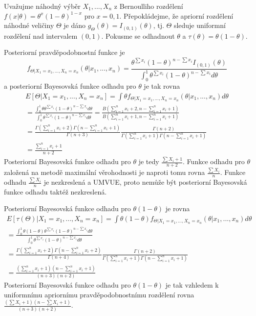\begin{example}
Uvažujme náhodný výběr $X_1, ..., X_n$ z Bernoulliho rozdělení $f(x|\theta) = \theta^x(1 - \theta)^{1-x}$ pro $x = 0, 1$. Přepokládejme, že apriorní rozdělení náhodné veličiny $\Theta$ je dáno $g_{\Theta}(\theta) = I_{(0, 1)}(\theta)$, tj. $\Theta$ sleduje uniformní rozdělení nad intervalem $(0, 1)$. Pokusme se odhadnout $\theta$ a $\tau(\theta) = \theta(1 - \theta)$.

Posteriorní pravděpodobnostní funkce je
\begin{equation*}
f_{\Theta|X_1 = x_1, ..., X_n = x_n}(\theta|x_1, ..., x_n) = \frac{\theta^{\sum x_i}(1 - \theta)^{n - \sum x_i}I_{(0,1)}(\theta)}{\int_0^1 \theta^{\sum x_i}(1 - \theta)^{n - \sum x_i}d \theta}
\end{equation*}
a posteriorní Bayesovská funkce odhadu pro $\theta$ je tak rovna
\begin{gather*}
E[\Theta|X_1 = x_1, ..., X_n = x_n] = \int \theta f_{\Theta|X_1 = x_1, ..., X_n = x_n}(\theta|x_1, ..., x_n) d\theta\\
= \frac{\int_0^1 \theta \theta^{\sum x_i}(1 - \theta)^{n - \sum x_i}d \theta}{\int_0^1 \theta^{\sum x_i}(1 - \theta)^{n - \sum x_i}d \theta} = \frac{B\left(\sum_{i = 1}^n x_i + 2, n - \sum_{i = 1}^n x_i + 1 \right)}{B \left(\sum_{i = 1}^n x_i + 1, n - \sum_{i = 1}^n x_i + 1 \right)}\\
= \frac{\Gamma\left(\sum_{i = 1}^n x_i + 2 \right)\Gamma\left(n - \sum_{i = 1}^n x_i + 1 \right)}{\Gamma(n + 3)}\frac{\Gamma(n + 2)}{\Gamma\left(\sum_{i = 1}^n x_i + 1 \right)\Gamma(n - \sum_{i = 1}^n x_i + 1)}\\
= \frac{\sum_{i = 1}^n x_i + 1}{n + 2}
\end{gather*}
Posteriorní Bayesovská funkce odhadu pro $\theta$ je tedy $\frac{\sum X_i + 1}{n + 2}$. Funkce odhadu pro $\theta$ založená na metodě maximální věrohodnosti je naproti tomu rovna $\frac{\sum X_i}{n}$. Funkce odhadu $\frac{\sum X_i}{n}$ je nezkreslená a UMVUE, proto nemůže být posteriorní Bayesovská funkce odhadu taktéž nezkreslená.

Posteriorní Bayesovská funkce odhadu pro $\theta(1 - \theta)$ je rovna
\begin{gather*}
E[\tau(\Theta)|X_1 = x_1, ..., X_n = x_n] = \int \theta(1 - \theta)f_{\Theta|X_1 = x_1, ..., X_n = x_n}(\theta|x_1, ..., x_n)d \theta\\
= \frac{\int_0^1 \theta(1 - \theta)\theta^{\sum x_i}(1 - \theta)^{n - \sum x_i}d \theta}{\int_0^1 \theta^{\sum x_i}(1 - \theta)^{n - \sum x_i}d \theta}\\
= \frac{\Gamma\left(\sum_{i = 1}^n x_i + 2 \right)\Gamma\left(n - \sum_{i = 1}^n x_i + 2 \right)}{\Gamma(n + 4)}\frac{\Gamma(n + 2)}{\Gamma\left(\sum_{i = 1}^n x_i + 1 \right)\Gamma(n - \sum_{i = 1}^n x_i + 1)}\\
= \frac{\left(\sum_{i = 1}^n x_i + 1\right)\left(n - \sum_{i = 1}^n x_i + 1\right)}{(n + 3)(n + 2)}
\end{gather*}
Posteriorní Bayesovská funkce odhadu pro $\theta(1 - \theta)$ je tak vzhledem k uniformnímu apriornímu pravděpodobnostnímu rozdělení rovna $\frac{\left(\sum X_i + 1\right)\left(n - \sum X_i + 1\right)}{(n + 3)(n + 2)}$.
\end{example}

